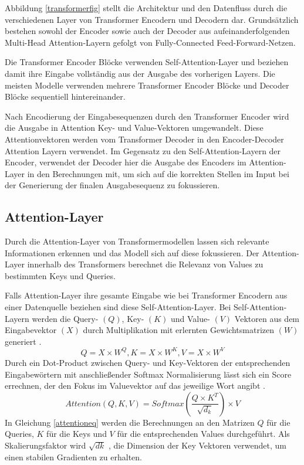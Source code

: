 Abbildung \ref{transformerfig} stellt die Architektur und den Datenfluss durch die verschiedenen Layer von Transformer Encodern und Decodern dar. 
Grundsätzlich bestehen sowohl der Encoder sowie auch der Decoder aus aufeinanderfolgenden Multi-Head Attention-Layern gefolgt von Fully-Connected Feed-Forward-Netzen.


Die Transformer Encoder Blöcke verwenden Self-Attention-Layer und beziehen damit ihre Eingabe vollständig aus der Ausgabe des vorherigen Layers. 
Die meisten Modelle verwenden mehrere Transformer Encoder Blöcke und Decoder Blöcke sequentiell hintereinander.

Nach Encodierung der Eingabesequenzen durch den Transformer Encoder wird die Ausgabe in Attention Key- und Value-Vektoren umgewandelt.
Diese Attentionvektoren werden vom Transformer Decoder in den Encoder-Decoder Attention Layern verwendet.
Im Gegensatz zu den Self-Attention-Layern der Encoder, verwendet der Decoder hier die Ausgabe des Encoders im Attention-Layer in den Berechnungen mit, um sich auf die korrekten Stellen im Input bei der Generierung der finalen Ausgabesequenz zu fokussieren.






\subsection{Attention-Layer} %
Durch die Attention-Layer von Transformermodellen lassen sich relevante Informationen erkennen und das Modell sich auf diese fokussieren. 
Der Attention-Layer innerhalb des Transformers berechnet die Relevanz von Values zu bestimmten Keys und Queries. 

Falls Attention-Layer ihre gesamte Eingabe wie bei Transformer Encodern aus einer Datenquelle beziehen sind diese Self-Attention-Layer.
Bei Self-Attention-Layern werden die Query- $(Q)$, Key- $(K)$ und Value- $(V)$ Vektoren aus dem Eingabevektor $(X)$ durch Multiplikation mit erlernten Gewichtsmatrizen $(W)$ generiert \citep{AttentionIALYN}. 
\begin{equation}
    Q = X \times W^{Q}, K = X \times W^{K}, V = X \times W^{V}
\end{equation}
Durch ein Dot-Product zwischen Query- und Key-Vektoren der entsprechenden Eingabewörtern mit anschließender Softmax Normalisierung lässt sich ein Score errechnen, der den Fokus im Valuevektor auf das jeweilige Wort angibt \citep{AttentionIALYN}.
\begin{equation}
    \label{attentioneq}
    Attention(Q,K,V) = Softmax(\frac{Q\times K^T}{\sqrt{d_k}})\times V
\end{equation}
In Gleichung \ref{attentioneq} werden die Berechnungen an den Matrizen $Q$ für die Queries, $K$ für die Keys und $V$ für die entsprechenden Values durchgeführt. Als Skalierungsfaktor wird $\sqrt{dk}$ , die Dimension der Key Vektoren verwendet, um einen stabilen Gradienten zu erhalten. 


